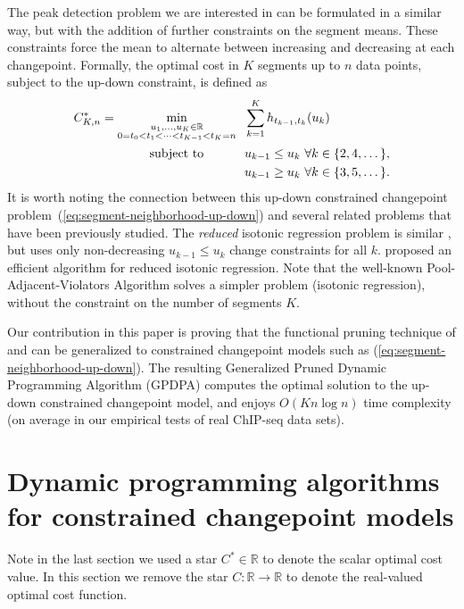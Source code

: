 \documentclass[twoside,11pt]{article}
\newcommand{\RR}{\mathbb R}
\begin{document}
The peak detection problem we are interested in can be formulated in a
similar way, but with the addition of further constraints on the
segment means. These constraints force the mean to alternate between
increasing and decreasing at each changepoint. 
Formally, the optimal cost in $K$ segments up to $n$ data points, subject to the up-down constraint, is defined as
\begin{align}
  \label{eq:segment-neighborhood-up-down}
C^*_{K,n} = \min_{\substack{
u_1,\dots, u_{K}\in\RR
\\
0=t_0<t_1<\cdots<t_{K-1}<t_K=n
}} & \ \
  \sum_{k=1}^K
h_{t_{k-1}, t_k}(u_k)\\
      \text{subject to \hskip 0.8cm} &\ \ u_{k-1} \leq u_k\ \forall k\in\{2,4,\dots\},
  \nonumber\\
  &\ \ u_{k-1} \geq u_k\ \forall k\in\{3,5,\dots\}.
  \nonumber
\end{align}
It is worth noting the connection between this up-down constrained
changepoint problem~(\ref{eq:segment-neighborhood-up-down}) and
several related problems that have been previously studied. The
\emph{reduced} isotonic regression problem is similar
\citep{reduced-monotonic-regression}, but uses only non-decreasing
$u_{k-1}\leq u_k$ change constraints for all $k$. \citet{hardwick2014optimal} proposed an efficient algorithm for 
reduced isotonic regression. Note that the well-known
Pool-Adjacent-Violators Algorithm \citep{mair2009isotone} solves a
simpler problem (isotonic regression), without the constraint on the
number of segments $K$.

Our contribution in this paper is proving
that the functional pruning technique of \citet{pruned-dp} and
\citet{fpop} can be generalized to constrained changepoint models such
as (\ref{eq:segment-neighborhood-up-down}). The
resulting Generalized Pruned Dynamic Programming Algorithm (GPDPA)
computes the optimal solution to the up-down constrained changepoint model, and enjoys $O(Kn\log n)$ time complexity (on average in our empirical
tests of real ChIP-seq data sets).

\section{Dynamic programming algorithms for constrained
  changepoint models}
\label{sec:algorithms}

Note in the last section we used a star $C^*\in\RR$ to denote the
scalar optimal cost value. In this section we remove the star
$C:\RR\rightarrow\RR$ to denote the real-valued optimal cost function.
\end{document}
